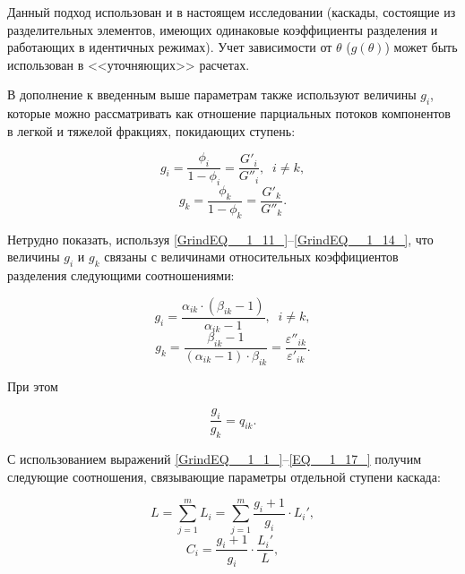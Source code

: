 Данный подход использован и в настоящем исследовании (каскады, состоящие из разделительных элементов, имеющих одинаковые коэффициенты разделения и работающих в идентичных режимах). Учет зависимости от $\theta$ ($g(\theta)$) может быть использован в <<уточняющих>> расчетах.

В дополнение к введенным выше параметрам также используют величины $g_{i}$, которые можно рассматривать как отношение парциальных потоков компонентов в легкой и тяжелой фракциях, покидающих ступень:

\begin{equation} \label{GrindEQ__1_13_} 
  g_{i} =\frac{\phi _{i} }{1-\phi _{i} } =\frac{G'_{i} }{G''_{i} } ,\; \; i\ne k, 
  \end{equation} 
  \begin{equation} \label{GrindEQ__1_14_} 
  g_{k} =\frac{\phi _{k} }{1-\phi _{k} } =\frac{G'_{k} }{G''_{k} } .           
\end{equation} 

Нетрудно показать, используя \ref{GrindEQ__1_11_}--\ref{GrindEQ__1_14_}, что величины $g_{i}$ и $g_{k}$  связаны с величинами относительных коэффициентов разделения следующими соотношениями:

\begin{equation} \label{EQ__1_15_} 
  g_{i} =\frac{\alpha _{ik}  \cdot (\beta _{ik} -1)}{\alpha _{ik} -1} ,\; \; i\ne k,           
  \end{equation} 
  \begin{equation} \label{EQ__1_16_} 
  g_{k} =\frac{\beta _{ik} -1}{(\alpha _{ik} -1) \cdot \beta _{ik} } =\frac{\varepsilon ''_{ik} }{\varepsilon '_{ik} } . 
\end{equation} 

При этом

\begin{equation} \label{EQ__1_17_} 
  \frac{g_{i} }{g_{k} } =q_{ik} .           
\end{equation} 

С использованием выражений \ref{GrindEQ__1_1_}--\ref{EQ__1_17_} получим следующие соотношения, связывающие параметры отдельной ступени каскада:

\begin{equation} \label{GrindEQ__1_18_} 
  L=\sum _{j=1}^{m}L_{i}  =\sum _{j=1}^{m}\frac{g_{i} +1}{g_{i} } \cdot L_{i} ',               
  \end{equation} 
  \begin{equation} \label{GrindEQ__1_19_} 
  C_{i} =\frac{g_{i} +1}{g_{i} } \cdot \frac{L_{i} '}{L} ,         
\end{equation}   

